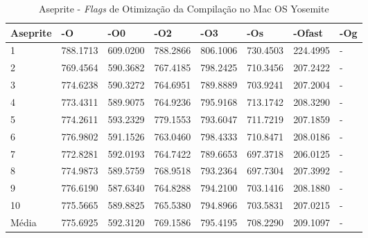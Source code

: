 \begin{apendicesenv}
\begin{table}[!ht]
\tiny
\centering
\caption{Aseprite - \textit{Flags} de Otimização da Compilação no Mac OS Yosemite}
\label{tab:otimizacao_compilacao:mac:aseprite}
\begin{tabular}{llllllll}
\textbf{Aseprite} & \textbf{-O}  & \textbf{-O0}   & \textbf{-O2} & \textbf{-O3} & \textbf{-Os} & \textbf{-Ofast} & \textbf{-Og} \\ \toprule
1                 & 788.1713     &  609.0200      &  788.2866    & 806.1006     &  730.4503  &   224.4995        &  -           \\ 
2                 & 769.4564     &  590.3682      &  767.4185    & 798.2425     &  710.3456  &   207.2422        &  -           \\ 
3                 & 774.6238     &  590.3272      &  764.6951    & 789.8889     &  703.9241  &   207.2004        &  -           \\ 
4                 & 773.4311     &  589.9075      &  764.9236    & 795.9168     &  713.1742  &   208.3290        &  -           \\ 
5                 & 774.2611     &  593.2329      &  779.1553    & 793.6047     &  711.7219  &   207.1859        &  -           \\ 
6                 & 776.9802     &  591.1526      &  763.0460    & 798.4333     &  710.8471  &   208.0186        &  -           \\ 
7                 & 772.8281     &  592.0193      &  764.7422    & 789.6653     &  697.3718  &   206.0125        &  -           \\ 
8                 & 774.9873     &  589.5759      &  768.9518    & 793.2364     &  697.7304  &   207.3992        &  -           \\ 
9                 & 776.6190     &  587.6340      &  764.8288    & 794.2100     &  703.1416  &   208.1880        &  -           \\ 
10                & 775.5665     &  589.8825      &  765.5380    & 794.8966     &  703.5831  &   207.0215        &  -           \\ \bottomrule
Média             & 775.6925     &  592.3120      &  769.1586    & 795.4195     &  708.2290  &   209.1097        &  -           \\ 
\end{tabular}
\end{table}


\end{apendicesenv}
